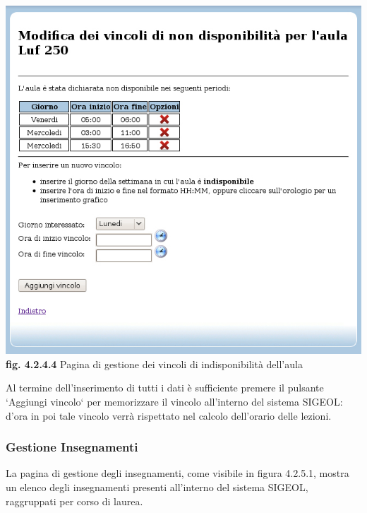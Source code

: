 \documentclass[11pt,a4paper]{article}
\begin{document}
\bigskip
\begin{center}
	\includegraphics[scale=0.5]{images/gestione_vincoli_aula.jpg}\\
	\textbf{fig. 4.2.4.4} Pagina di gestione dei vincoli di indisponibilità dell'aula\\
\end{center}
\bigskip

Al termine dell'inserimento di tutti i dati è sufficiente premere il pulsante `Aggiungi vincolo` per memorizzare il vincolo all'interno del sistema SIGEOL: d'ora in poi tale vincolo verrà rispettato nel calcolo dell'orario delle lezioni.
\subsubsection{Gestione Insegnamenti}
La pagina di gestione degli insegnamenti, come visibile in figura 4.2.5.1, mostra un elenco degli insegnamenti presenti all'interno del sistema SIGEOL, raggruppati per corso di laurea.
\end{document}
